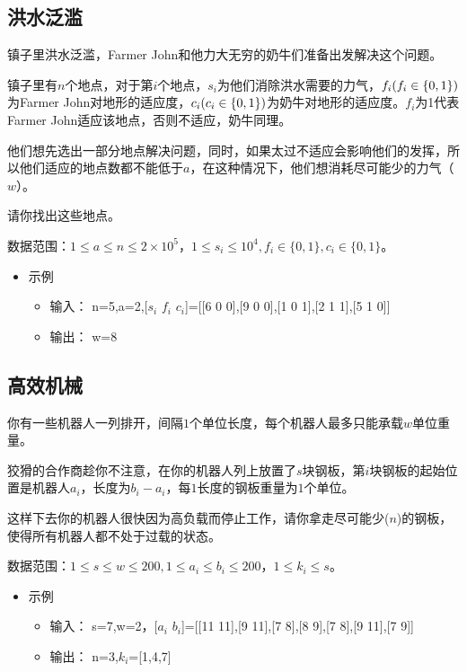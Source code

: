 \documentclass[12pt,a4paper]{article}
\begin{document}
\subsection{洪水泛滥}

镇子里洪水泛滥，Farmer John和他力大无穷的奶牛们准备出发解决这个问题。

镇子里有$n$个地点，对于第$i$个地点，$s_i$为他们消除洪水需要的力气，$f_i \space (f_i \in \{0, 1\})$为Farmer John对地形的适应度，$c_i \space (c_i \in \{0, 1\})$为奶牛对地形的适应度。$f_i$为1代表Farmer John适应该地点，否则不适应，奶牛同理。

他们想先选出一部分地点解决问题，同时，如果太过不适应会影响他们的发挥，所以他们适应的地点数都不能低于$a$，在这种情况下，他们想消耗尽可能少的力气（$w$）。

请你找出这些地点。

数据范围：$1 \leq a \leq n \leq 2 \times 10^{5}，1 \leq s_i \leq 10^4,f_i \in \{0, 1\},c_i \in \{0, 1\}$。

\begin{itemize} [noitemsep]
    \item 示例
          \begin{itemize}[noitemsep]
              \item[] 输入： n=5,a=2,[$s_i$ $f_i$ $c_i$]=[[6 0 0],[9 0 0],[1 0 1],[2 1 1],[5 1 0]]
              \item[] 输出： w=8
          \end{itemize}
\end{itemize}

\subsection{高效机械}

你有一些机器人一列排开，间隔$1$个单位长度，每个机器人最多只能承载$w$单位重量。

狡猾的合作商趁你不注意，在你的机器人列上放置了$s$块钢板，第$i$块钢板的起始位置是机器人$a_i$，长度为$b_i - a_i$，每$1$长度的钢板重量为$1$个单位。

这样下去你的机器人很快因为高负载而停止工作，请你拿走尽可能少($n$)的钢板，使得所有机器人都不处于过载的状态。

数据范围：$1\leq s \leq w \leq 200,1 \leq a_i \leq b_i \leq 200$，$1\leq k_i \leq s$。

\begin{itemize} [noitemsep]
    \item 示例
          \begin{itemize}[noitemsep]
              \item[] 输入： s=7,w=2，[$a_i$ $b_i$]=[[11 11],[9 11],[7 8],[8 9],[7 8],[9 11],[7 9]]
              \item[] 输出： n=3,$k_i$=[1,4,7]
          \end{itemize}
\end{itemize}
\end{document}
